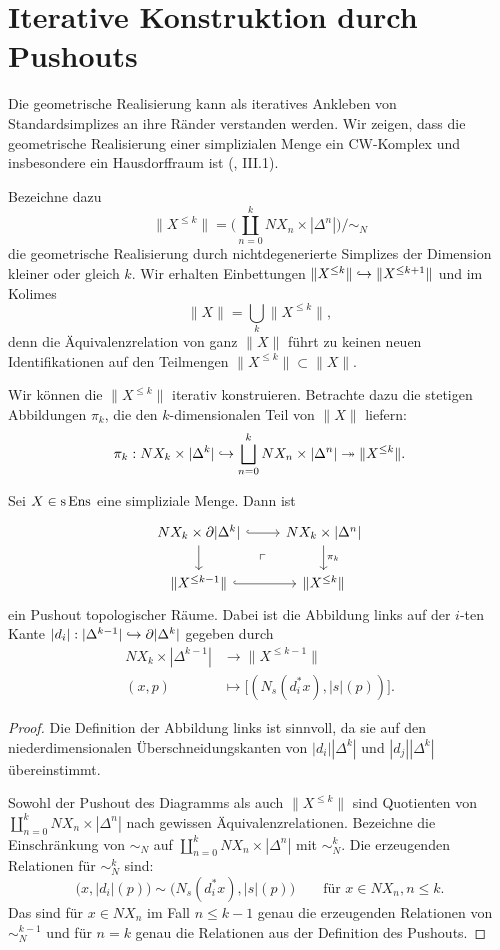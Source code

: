 \section{Iterative Konstruktion durch Pushouts}

Die geometrische Realisierung kann als iteratives Ankleben von
Standardsimplizes an ihre Ränder verstanden werden. Wir zeigen, dass
die geometrische Realisierung einer simplizialen Menge ein CW-Komplex
und insbesondere ein Hausdorffraum ist (\cite{Moer}, III.1).

Bezeichne dazu
\[ \|X^{\leq k}\| =
\bigg( \coprod_{n = 0}^k NX_n \times |\Delta^n| \bigg) \big/ \sim_N \]
die geometrische Realisierung durch nichtdegenerierte Simplizes der
Dimension kleiner oder gleich $k$. Wir erhalten Einbettungen
$\|X^{\leq k}\| \hookrightarrow \|X^{\leq k+1}\|$ und im Kolimes
\[ \|X\| = \bigcup_k \|X^{\leq k}\|, \]
denn die Äquivalenzrelation von ganz $\|X\|$ führt zu keinen neuen
Identifikationen auf den Teilmengen $\|X^{\leq k}\| \subset \|X\|$.

Wir können die $\|X^{\leq k}\|$ iterativ konstruieren. Betrachte dazu
die stetigen Abbildungen $\pi_k$, die den $k$-dimensionalen Teil von
$\|X\|$ liefern:
\[ \pi_k: NX_k \times |\Delta^k|
  \hookrightarrow \bigsqcup_{n=0}^k NX_n \times |\Delta^n|
  \twoheadrightarrow \|X^{\leq k}\|. \]

\begin{prop}
  Sei $X \in \operatorname{s}\operatorname{Ens}$ eine simpliziale Menge. Dann ist
  \[ \begin{tikzcd}
    NX_k \times \del |\Delta^k| \arrow[r, hook] \arrow[d]
    \arrow[dr, phantom, "\ulcorner"]
    & NX_k \times |\Delta^n| \arrow[d, "\pi_k"] \\
    \|X^{\leq k-1}\| \arrow[r, hook]
    & \|X^{\leq k}\|
  \end{tikzcd} \]
  ein Pushout topologischer Räume. Dabei ist die Abbildung links auf
  der $i$-ten Kante $|d_i|: |\Delta^{k-1}| \hookrightarrow \partial |\Delta^k|$
  gegeben durch
  \begin{align*}
    NX_k \times |\Delta^{k-1}| &\to \|X^{\leq k-1}\| \\
    (x, p) &\mapsto \big[ (N_s(d_i^* x), |s|(p)) \big].
  \end{align*}
\end{prop}
\begin{proof}
  Die Definition der Abbildung links ist sinnvoll, da sie auf den
  niederdimensionalen Überschneidungskanten von $|d_i| |\Delta^k|$ und
  $|d_j| |\Delta^k|$ übereinstimmt.
  
  Sowohl der Pushout des Diagramms als auch $\|X^{\leq k}\|$ sind
  Quotienten von $\coprod_{n=0}^k NX_n \times |\Delta^n|$ nach
  gewissen Äquivalenzrelationen. Bezeichne die Einschränkung von
  $\sim_N$ auf $\coprod_{n=0}^k NX_n \times |\Delta^n|$ mit
  $\sim_N^k$. Die erzeugenden Relationen für $\sim_N^k$ sind:
  \[ \big( x, |d_i|(p) \big) \sim \big( N_s(d_i^* x), |s|(p) \big)
  \qquad \text{für } x \in NX_n, n \leq k.
  \]
  Das sind für $x \in NX_n$ im Fall $n \leq k-1$ genau die erzeugenden
  Relationen von $\sim_N^{k-1}$ und für $n = k$ genau die Relationen
  aus der Definition des Pushouts.
\end{proof}

